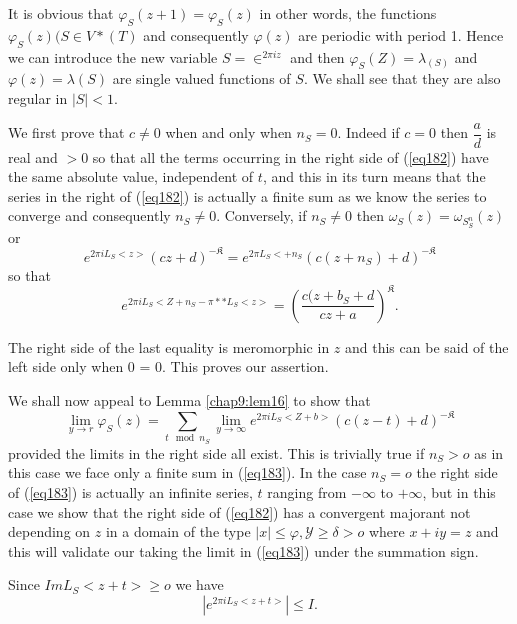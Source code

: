 \setcounter{pageoriginal}{141}
It is obvious that $\varphi_S (z + 1) = \varphi_S (z)$ in other words,
the functions\pageoriginale  $\varphi_S (z) ( S \in V* (T)$ and
consequently $\varphi 
(z)$ are periodic with period 1. Hence we can introduce the new
variable $S = \in ^{2 \pi i z}$ and then $\varphi_S (Z) =
\lambda_{(S)}$ and $\varphi (z) = \lambda (S)$ are single valued
functions of $S$. We shall see that they are also regular in $|S| <
1$. 

We first prove that $c \neq 0$ when and only when $n_S = 0$. Indeed
if $c = 0$ then $\dfrac{a}{d}$ is real and $> 0$ so that all the terms
occurring in the right side of (\ref{eq182}) have the same absolute value,
independent of $t$, and this in its turn means that the series in  the
right of (\ref{eq182}) is actually a finite sum as we know the series to
converge and consequently $n_S \neq 0$. Conversely, if $n_S \neq 0$
then $\omega _S (z) = \omega_{S^n_S}(z)$ or  
$$
e^{2 \pi i L_S <z>}(cz+d)^{-\mathfrak{K}} = e^{2 \pi L_S < + n_S} (c (z
+ n_S) +d)^{- \mathfrak{K}} 
$$
so that 
$$
e^{2 \pi i L_S <Z + n_S - \pi ** L_S<z>} = \left( \frac{c(z+ b_S+d}{cz
  + a} \right)^{\mathfrak{K}}. 
$$

The right side  of the last equality is meromorphic in $z$ and this
can be said of the left side only when 0 = 0. This proves our
assertion. 

We shall now appeal to Lemma \ref{chap9:lem16} to show that
\begin{equation*}
\lim\limits_{y \to r}
\varphi_S (z) = \sum\limits_{ t \mod n_S} \lim\limits_{y \to \infty}
e^{2 \pi i L_S<Z +b>} (c (z - t)+d)^{-\mathfrak{K}} \tag{183}\label{eq183}  
\end{equation*}\pageoriginale 
provided the limits in the right side all exist. This is trivially
true if $n_S>o$ as in this case we face only a finite sum in
(\ref{eq183}). In the case $n_S  = o$ the right side of (\ref{eq183})
is actually 
an infinite series, $t$ ranging from $-\infty$ to $+ \infty$, but in
this case we show that the right side of (\ref{eq182}) has a convergent
majorant not depending on $z$ in a domain of the type $| x | \le
\varphi, \mathscr{Y} \ge \delta > o$ where $x + i y = z$ and this will
validate our taking the limit in (\ref{eq183}) under the summation sign. 

Since $I m L_S < z + t> \ge o$ we have
$$ 
| e^{2 \pi i L_S< z + t>} |\le I.
$$

